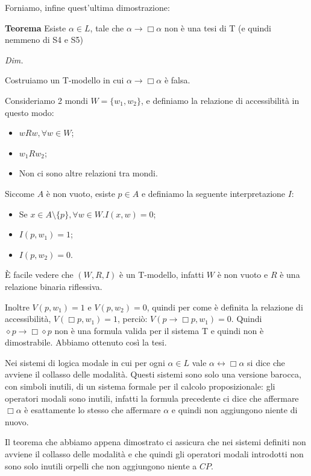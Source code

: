\documentclass[a4paper, titlepage, 12pt]{report}
\begin{document}
Forniamo, infine quest'ultima dimostrazione:

\begin{flushleft}
\textbf{Teorema}
Esiste $\alpha \in L$, tale che $\alpha \rightarrow \Box \alpha$ non è una tesi di T (e quindi nemmeno di S4 e S5)

\textit{Dim.}

Costruiamo un T-modello in cui $\alpha \rightarrow \Box \alpha$ è falsa.

Consideriamo 2 mondi $W = \{w_1, w_2\}$, e definiamo la relazione di accessibilità
in questo modo:
\begin{itemize}
    \item $wRw, \forall w \in W$;
    \item $w_1Rw_2$;
    \item Non ci sono altre relazioni tra mondi.
\end{itemize}

Siccome $A$ è non vuoto, esiste $p \in A$ e definiamo la seguente interpretazione $I:$
\begin{itemize}
    \item Se $x \in A \setminus \{p\}, \forall w \in W. I(x, w) = 0$;
    \item $I(p, w_1) = 1$;
    \item $I(p, w_2) = 0$.
\end{itemize}


È facile vedere che $(W, R, I)$ è un T-modello, infatti $W$ è non vuoto e
$R$ è una relazione binaria riflessiva.

Inoltre $V(p, w_1) = 1$ e $V(p, w_2) = 0$, quindi per come è definita
la relazione di accessibilità, $V(\Box p, w_1) = 1$, perciò: $V(p \rightarrow \Box p, w_1) = 0$.
Quindi $\diamond p \rightarrow \Box\diamond p$ non è una formula valida per il sistema T e quindi
non è dimostrabile.
Abbiamo ottenuto così la tesi.

\end{flushleft}

Nei sistemi di logica modale in cui per ogni
$\alpha \in L$ vale $\alpha \leftrightarrow \Box \alpha$ si dice che avviene il collasso
delle modalità. Questi sistemi sono solo una versione barocca, con simboli inutili,
di un sistema formale per il calcolo proposizionale:
gli operatori modali sono inutili, infatti la formula
precedente ci dice che affermare $\Box \alpha$ è esattamente lo stesso che affermare $\alpha$
e quindi non aggiungono niente di nuovo.

Il teorema che abbiamo appena dimostrato ci assicura che nei sistemi definiti non avviene
il collasso delle modalità e che quindi gli operatori modali introdotti non sono solo inutili
orpelli che non aggiungono niente a $CP$.
\end{document}
